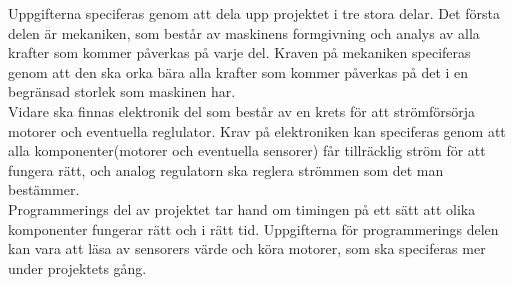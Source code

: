 Uppgifterna speciferas genom att dela upp projektet i tre stora delar. Det första delen är mekaniken, som består av maskinens formgivning och analys av alla krafter som kommer påverkas på varje del. Kraven på mekaniken speciferas genom att den ska orka bära alla krafter som kommer påverkas på det i en begränsad storlek som maskinen har.\\

Vidare ska finnas elektronik del som består av en krets för att strömförsörja motorer och eventuella reglulator. Krav på elektroniken kan speciferas genom att alla komponenter(motorer och eventuella sensorer) får tillräcklig ström för att fungera rätt, och analog regulatorn ska reglera strömmen som det man bestämmer.\\

Programmerings del av projektet tar hand om timingen på ett sätt att olika komponenter fungerar rätt och i rätt tid. Uppgifterna för programmerings delen kan vara att läsa av sensorers värde och köra motorer, som ska speciferas mer under projektets gång.